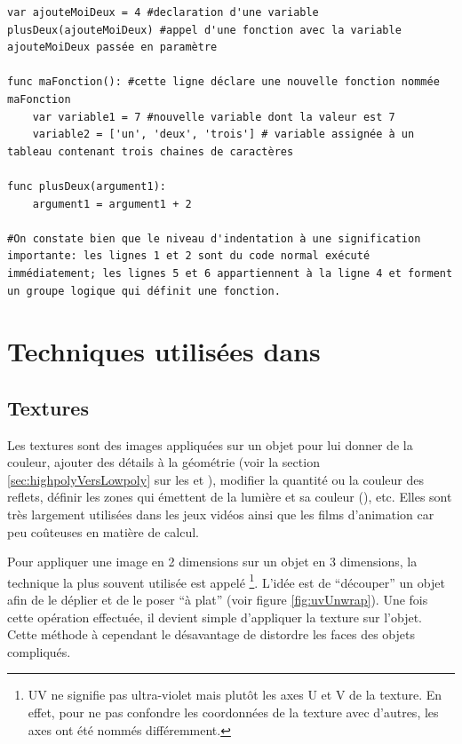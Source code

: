 \renewcommand{\codeTitle}{Les bases de GDScript}
\begin{lstlisting}[caption=basics.gd]
var ajouteMoiDeux = 4 #declaration d'une variable
plusDeux(ajouteMoiDeux) #appel d'une fonction avec la variable ajouteMoiDeux passée en paramètre

func maFonction(): #cette ligne déclare une nouvelle fonction nommée maFonction
	var variable1 = 7 #nouvelle variable dont la valeur est 7
	variable2 = ['un', 'deux', 'trois'] # variable assignée à un tableau contenant trois chaines de caractères

func plusDeux(argument1):
	argument1 = argument1 + 2

#On constate bien que le niveau d'indentation à une signification importante: les lignes 1 et 2 sont du code normal exécuté immédiatement; les lignes 5 et 6 appartiennent à la ligne 4 et forment un groupe logique qui définit une fonction.
\end{lstlisting}



\section{Techniques utilisées dans \nomJeu}
\subsection{Textures}
\label{sec:textures}
Les textures sont des images appliquées sur un objet pour lui donner de la couleur, ajouter des détails à la géométrie (voir la section \ref{sec:highpolyVersLowpoly} sur les  et  ), modifier la quantité ou la couleur des reflets, définir les zones qui émettent de la lumière et sa couleur (), etc. Elles sont très largement utilisées dans les jeux vidéos ainsi que les films d'animation car peu coûteuses en matière de calcul.

Pour appliquer une image en 2 dimensions sur un objet en 3 dimensions, la technique la plus souvent utilisée est appelé \footnote{UV ne signifie pas ultra-violet mais plutôt les axes U et V de la texture. En effet, pour ne pas confondre les coordonnées de la texture avec d'autres, les axes ont été nommés différemment.}. L'idée est de \enquote{découper} un objet afin de le déplier et de le poser \enquote{à plat} (voir figure \ref{fig:uvUnwrap}). Une fois cette opération effectuée, il devient simple d'appliquer la texture sur l'objet. Cette méthode à cependant le désavantage de distordre les faces des objets compliqués.

